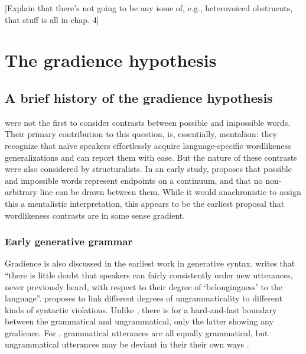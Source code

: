 [Explain that there's not going to be any issue of, e.g., heterovoiced obstruents, that stuff is all in chap. 4]

\section{The gradience hypothesis} \label{gradhyp}


\subsection{A brief history of the gradience hypothesis} \label{history}

\citet{Chomsky1965} were not the first to consider contrasts between possible and impossible words. Their primary contribution to this question, is, essentially, mentalism: they recognize that naïve speakers effortlessly acquire language-specific wordlikeness generalizations and can report them with ease. But the nature of these contrasts were also considered by structuralists. In an early study, \citet{Fischer-Jorgensen1952} proposes that possible and impossible words represent endpoints on a continuum, and that no non-arbitrary line can be drawn between them. While it would anachronistic to assign this a mentalistic interpretation, this appears to be the earliest proposal that wordlikeness contrasts are in some sense gradient. 

\subsubsection{Early generative grammar}

Gradience is also discussed in the earliest work in generative syntax. \citet[][132]{LSLT} writes that ``there is little doubt that speakers can fairly consistently order new utterances, never previously heard, with respect to their degree of `belongingness' to the language''. \citet{ASPECTS} proposes to link different degrees of ungrammaticality to different kinds of syntactic violations. Unlike \citeauthor{Fischer-Jorgensen1952}, there is for \citeauthor{LSLT} a hard-and-fast boundary between the grammatical and ungrammatical, only the latter showing any gradience. For \citeauthor{LSLT}, grammatical utterances are all equally grammatical, but ungrammatical utterances may be deviant in their their own ways \citep[][61]{Schutze1996}.

